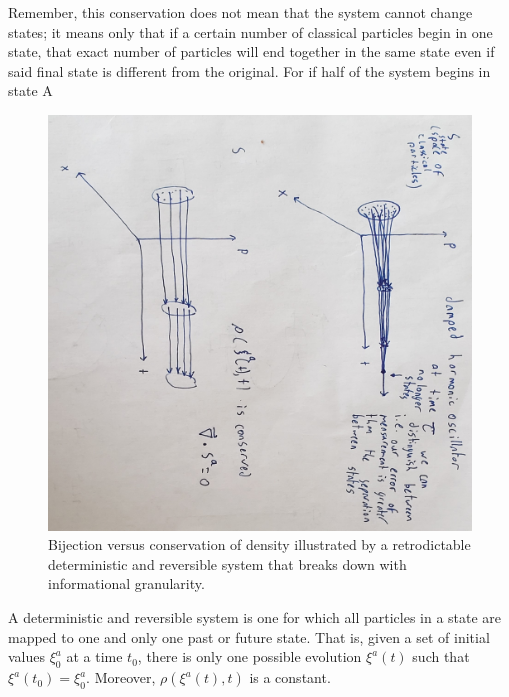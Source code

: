 \documentclass{article}
\begin{document}
	Remember, this conservation does not mean that the system cannot change states; it means only that if a certain number of classical particles begin in one state, that exact number of particles will end together in the same state even if said final state is different from the original. For if half of the system begins in state A 
	
\begin{figure}[!ht]
\centerline{\includegraphics[width=\textwidth,angle=90,scale=.6]{streamfunctiondiagram.jpg}}
\caption{Bijection versus conservation of density illustrated by a retrodictable deterministic and reversible system that breaks down with informational granularity.}
\end{figure}

\begin{defn}
	A deterministic and reversible system is one for which all particles in a state are mapped to one and only one past or future state. That is, given a set of initial values $\xi^a_0$ at a time $t_0$, there is only one possible evolution $\xi^a(t)$ such that $\xi^a(t_0) = \xi^a_0$. Moreover, $\rho(\xi^a(t), t)$ is a constant.
\end{defn}
\end{document}
